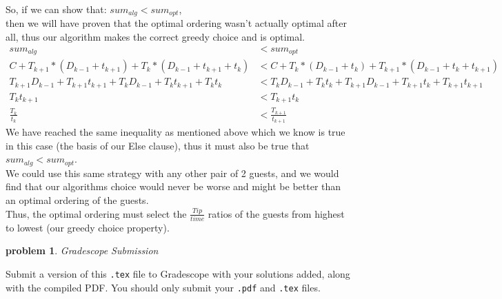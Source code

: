 \documentclass[10pt]{article}
\newtheorem{problem}{\sc\color{cit}problem}
\begin{document}
{    So, if we can show that: \quad $sum_{alg} < sum_{opt}$, \\
    then we will have proven that the optimal ordering wasn't actually optimal after all, thus our algorithm makes the correct greedy choice and is optimal.
    \begin{align*}
        sum_{alg} &< sum_{opt} \\
        C + T_{k+1} * (D_{k-1} + t_{k+1}) + T_k * (D_{k-1} + t_{k+1} + t_k) &< C + T_k * (D_{k-1} + t_k) + T_{k+1} * (D_{k-1} + t_k + t_{k+1}) \\
        T_{k+1}D_{k-1} + T_{k+1}t_{k+1} + T_kD_{k-1} + T_kt_{k+1} + T_kt_k &< T_kD_{k-1} + T_kt_k + T_{k+1}D_{k-1} + T_{k+1}t_k + T_{k+1}t_{k+1} \\
        T_kt_{k+1} &< T_{k+1}t_k \\
        \frac{T_k}{t_k} &< \frac{T_{k+1}}{t_{k+1}}
    \end{align*}
    We have reached the same inequality as mentioned above which we know is true in this case (the basis of our Else clause), thus it must also be true that $sum_{alg} < sum_{opt}$. \\ 
    We could use this same strategy with any other pair of 2 guests, and we would find that our algorithms choice would never be worse and might be better than an optimal ordering of the guests. \\
    Thus, the optimal ordering must select the $\frac{Tip}{time}$ ratios of the guests from highest to lowest (our greedy choice property).
    
    }

\begin{problem} Gradescope Submission \end{problem}
Submit a version of this \verb|.tex| file to Gradescope with your solutions added, along with the compiled PDF.  You should only submit your \verb|.pdf| and \verb|.tex| files.
\end{document}

